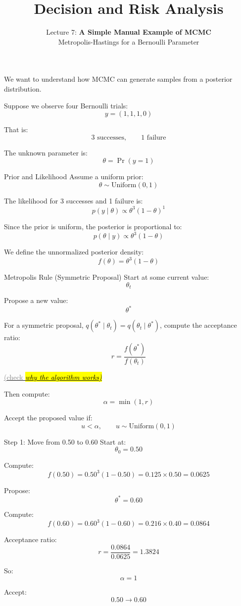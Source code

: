 \documentclass[aspectratio=43,11pt]{beamer}
\title{Decision and Risk Analysis}
\subtitle{Lecture 7: \textbf{A Simple Manual Example of MCMC}\\
Metropolis-Hastings for a Bernoulli Parameter}
\author{}
\date{
\color{aggiemaroon}{
DAEN 427 / ISEN 427 / ISEN 627 - Fall 2026\\
\textbf{Alexander Abuabara}
}
}
\begin{document}
\begin{frame}[plain]
  \titlepage
\end{frame}

\begin{frame}{}
We want to understand how MCMC can generate samples from a posterior distribution.

\vspace{0.4cm}
Suppose we observe four Bernoulli trials:
\[
 y = (1,1,1,0)
\]

That is:
\[
 3 \text{ successes}, \qquad 1 \text{ failure}
\]

\vspace{0.3cm}
The unknown parameter is:
\[
\theta = \Pr(y=1)
\]
\end{frame}

\begin{frame}{Prior and Likelihood}
Assume a uniform prior:
\[
\theta \sim \text{Uniform}(0,1)
\]

The likelihood for 3 successes and 1 failure is:
\[
 p(y \mid \theta) \propto \theta^3(1-\theta)^1
\]

Since the prior is uniform, the posterior is proportional to:
\[
 p(\theta \mid y) \propto \theta^3(1-\theta)
\]

We define the unnormalized posterior density:
\[
 f(\theta)=\theta^3(1-\theta)
\]
\end{frame}

\begin{frame}{Metropolis Rule (Symmetric Proposal)}
Start at some current value:
\[
\theta_t
\]

Propose a new value:
\[
\theta^*
\]

For a symmetric proposal, $q(\theta^*\mid\theta_t)=q(\theta_t\mid\theta^*)$,
compute the acceptance ratio:
\[
 r = \frac{f(\theta^*)}{f(\theta_t)}
\]

\href{https://www.bayesrulesbook.com/chapter-7\#why-the-algorithm-works}{\footnotesize \textcolor{gray}{(check \hl{\it why the algorithm works)}}}

Then compute:
\[
 \alpha = \min(1,r)
\]

Accept the proposed value if:
\[
 u < \alpha, \qquad u \sim \text{Uniform}(0,1)
\]
\end{frame}

\begin{frame}{Step 1: Move from 0.50 to 0.60}
Start at:
\[
\theta_0 = 0.50
\]

Compute:
\[
 f(0.50)=0.50^3(1-0.50)=0.125 \times 0.50=0.0625
\]

Propose:
\[
\theta^*=0.60
\]

Compute:
\[
 f(0.60)=0.60^3(1-0.60)=0.216 \times 0.40=0.0864
\]

Acceptance ratio:
\[
 r=\frac{0.0864}{0.0625}=1.3824
\]

So:
\[
\alpha=1
\]

Accept:
\[
0.50 \rightarrow 0.60
\]
\end{frame}
\end{document}
